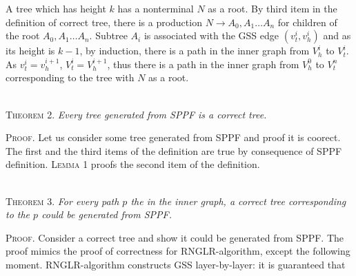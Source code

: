 A tree which has height $k$ has a nonterminal $N$ as a root. By third item in the definition of correct tree, 
there is a production $N \rightarrow A_{0}, A_{1} \dots A_{n}$ for children of the root $A_{0}, A_{1} \dots A_{n}$. 
Subtree $A_{i}$ is associated with the GSS edge $(v_{t}^{i}, v_{h}^{i})$ and as its height is $k-1$, by induction,
there is a path in the inner graph from $V_{h}^{i}$ to $V_{t}^{i}$. As $v_{t}^i = v_{h}^{i+1}$, $V_{t}^i = V_{h}^{i+1}$, 
thus there is a path in the inner graph from $V_{h}^{0}$ to $V_{t}^{n}$ corresponding to the tree with $N$ as a root.

~\\
\textsc{Theorem 2.} 
\textit{Every tree generated from SPPF is a correct tree.}

\textsc{Proof.} Let us consider some tree generated from SPPF and proof it is coorect. 
The first and the third items of the definition are true by consequence of SPPF definition.
\textsc{Lemma 1} proofs the second item of the definition.

~\\
\textsc{Theorem 3.} 
\textit{For every path $p$ the in the inner graph, a correct tree corresponding to the $p$ could be generated from SPPF.}

\textsc{Proof.}
Consider a correct tree and show it could be generated from SPPF. The proof mimics the proof of correctness for RNGLR-algorithm,
except the following moment. RNGLR-algorithm constructs GSS layer-by-layer: it is guaranteed that 



